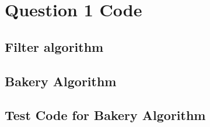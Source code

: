 \documentclass[11pt]{article}
\begin{document}
\appendix
\section{Question 1 Code}
\subsection{Filter algorithm}

\subsection{Bakery Algorithm}

\subsection{Test Code for Bakery Algorithm}

\end{document}
